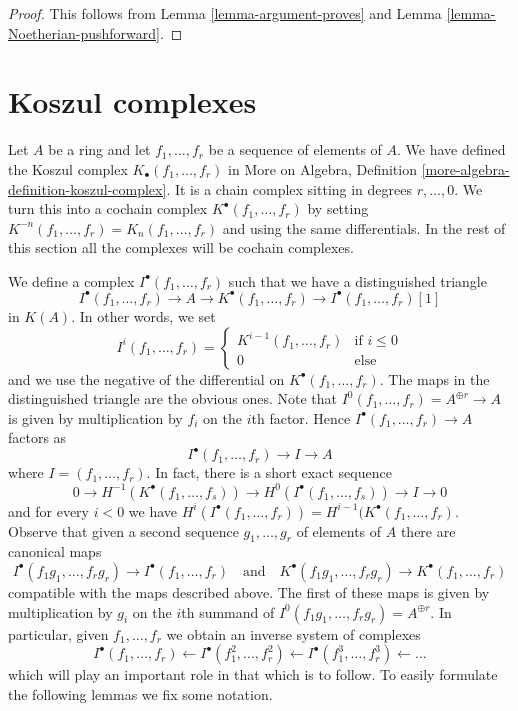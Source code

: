 \begin{proof}
This follows from Lemma \ref{lemma-argument-proves} and
Lemma \ref{lemma-Noetherian-pushforward}.
\end{proof}






\section{Koszul complexes}
\label{section-koszul}

\noindent
Let $A$ be a ring and let $f_1, \ldots, f_r$ be a sequence of elements
of $A$. We have defined the Koszul complex
$K_\bullet(f_1, \ldots, f_r)$ in
More on Algebra, Definition \ref{more-algebra-definition-koszul-complex}.
It is a chain complex sitting in degrees $r, \ldots, 0$.
We turn this into a cochain complex $K^\bullet(f_1, \ldots, f_r)$
by setting $K^{-n}(f_1, \ldots, f_r) = K_n(f_1, \ldots, f_r)$
and using the same differentials. In the rest of this section all
the complexes will be cochain complexes.

\medskip\noindent
We define a complex $I^\bullet(f_1, \ldots, f_r)$
such that we have a distinguished triangle
$$
I^\bullet(f_1, \ldots, f_r) \to
A \to
K^\bullet(f_1, \ldots, f_r) \to
I^\bullet(f_1, \ldots, f_r)[1]
$$
in $K(A)$.
In other words, we set
$$
I^i(f_1, \ldots, f_r) =
\left\{
\begin{matrix}
K^{i - 1}(f_1, \ldots, f_r) & \text{if } i \leq 0 \\
0 & \text{else}
\end{matrix}
\right.
$$
and we use the negative of the differential on $K^\bullet(f_1, \ldots, f_r)$.
The maps in the distinguished triangle are the obvious ones. Note that
$I^0(f_1, \ldots, f_r) = A^{\oplus r} \to A$ is given by
multiplication by $f_i$ on the $i$th factor.
Hence $I^\bullet(f_1, \ldots, f_r) \to A$ factors as
$$
I^\bullet(f_1, \ldots, f_r) \to I \to A
$$
where $I = (f_1, \ldots, f_r)$. In fact, there is a short exact sequence
$$
0 \to H^{-1}(K^\bullet(f_1, \ldots, f_s)) \to
H^0(I^\bullet(f_1, \ldots, f_s)) \to I \to 0
$$
and for every $i < 0$ we have
$H^i(I^\bullet(f_1, \ldots, f_r)) = H^{i - 1}(K^\bullet(f_1, \ldots, f_r)$.
Observe that given a second sequence $g_1, \ldots, g_r$ of elements of $A$
there are canonical maps
$$
I^\bullet(f_1g_1, \ldots, f_rg_r) \to I^\bullet(f_1, \ldots, f_r)
\quad\text{and}\quad
K^\bullet(f_1g_1, \ldots, f_rg_r) \to K^\bullet(f_1, \ldots, f_r)
$$
compatible with the maps described above. The first of these maps is
given by multiplication by $g_i$ on the $i$th summand of
$I^0(f_1g_1, \ldots, f_rg_r) = A^{\oplus r}$. In particular, given
$f_1, \ldots, f_r$ we obtain an inverse system of complexes
\begin{equation}
\label{equation-system}
I^\bullet(f_1, \ldots, f_r) \leftarrow
I^\bullet(f_1^2, \ldots, f_r^2) \leftarrow
I^\bullet(f_1^3, \ldots, f_r^3) \leftarrow \ldots
\end{equation}
which will play an important role in that which is to follow.
To easily formulate the following lemmas we fix some notation.

